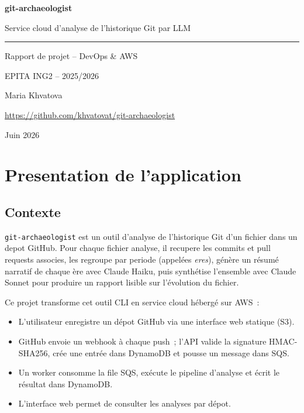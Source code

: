 \documentclass[11pt,a4paper]{article}
\newcommand{\code}[1]{\texttt{#1}}
\begin{document}
\begin{titlepage}
  \centering
  \vspace*{3cm}
  {\Huge\bfseries git-archaeologist\par}
  \vspace{0.5cm}
  {\large Service cloud d'analyse de l'historique Git par LLM\par}
  \vspace{2cm}
  \rule{0.5\linewidth}{0.5pt}\par
  \vspace{1.5cm}
  {\large Rapport de projet -- DevOps \& AWS\par}
  \vspace{0.5cm}
  {\normalsize EPITA ING2 -- 2025/2026\par}
  \vspace{1cm}
  {\normalsize Maria Khvatova\par}
  \vspace{0.3cm}
  {\small \url{https://github.com/khvatovat/git-archaeologist}\par}
  \vfill
  {\small Juin 2026}
\end{titlepage}

\tableofcontents
\newpage

\section{Presentation de l'application}

\subsection{Contexte}

\code{git-archaeologist} est un outil d'analyse de l'historique Git d'un fichier dans un depot GitHub. Pour chaque fichier analyse, il recupere les commits et pull requests associes, les regroupe par periode (appel\'{e}es \textit{eres}), g\'{e}n\`{e}re un r\'{e}sum\'{e} narratif de chaque \`{e}re avec Claude Haiku, puis synth\'{e}tise l'ensemble avec Claude Sonnet pour produire un rapport lisible sur l'\'{e}volution du fichier.

Ce projet transforme cet outil CLI en service cloud h\'{e}berg\'{e} sur AWS~:

\begin{itemize}[noitemsep]
  \item L'utilisateur enregistre un d\'{e}pot GitHub via une interface web statique (S3).
  \item GitHub envoie un webhook \`{a} chaque push~; l'API valide la signature HMAC-SHA256, cr\'{e}e une entr\'{e}e dans DynamoDB et pousse un message dans SQS.
  \item Un worker consomme la file SQS, ex\'{e}cute le pipeline d'analyse et \'{e}crit le r\'{e}sultat dans DynamoDB.
  \item L'interface web permet de consulter les analyses par d\'{e}pot.
\end{itemize}
\end{document}
